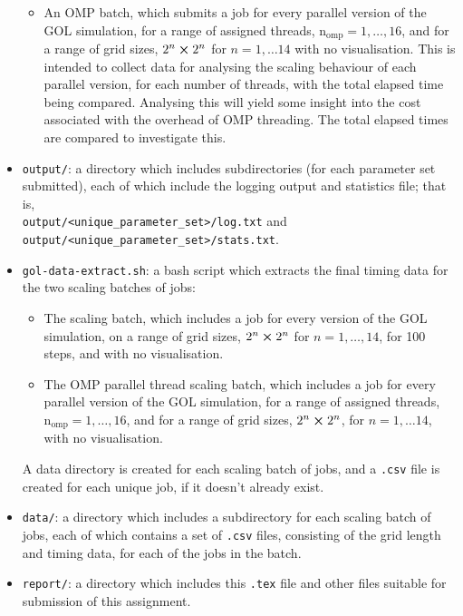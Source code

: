 \documentclass[]{article}
\begin{document}
\begin{itemize}
\begin{itemize}
  \item An OMP batch, which submits a job for every parallel version of the GOL
    simulation, for a range of assigned threads,
    $\mathrm{n_{omp}} = 1, \dotsc, 16$, and for a range of grid sizes,
    $2^{n} \cross 2^{n}$ for $n = 1, \dotsc 14$ with no visualisation.
    This is intended to collect data for analysing the scaling behaviour of each
    parallel version, for each number of threads, with the total elapsed time
    being compared.
    Analysing this will yield some insight into the cost associated with the
    overhead of OMP threading.
    The total elapsed times are compared to investigate this.

  \end{itemize}

\item \lstinline[style=ff]{output/}: a directory which includes subdirectories
  (for each parameter set submitted), each of which include the logging output
  and statistics file; that is, \\
  \lstinline[style=ff]{output/<unique_parameter_set>/log.txt} and \\
  \lstinline[style=ff]{output/<unique_parameter_set>/stats.txt}.

\item \lstinline[style=ff]{gol-data-extract.sh}: a bash script which extracts
  the final timing data for the two scaling batches of jobs:
  \begin{itemize}
  \item The scaling batch, which includes a job for every version of the GOL
    simulation, on a range of grid sizes, $2^{n} \cross 2^{n}$ for
    $n = 1, \dotsc, 14$, for 100 steps, and with no visualisation.

  \item The OMP parallel thread scaling batch, which includes a job for every
    parallel version of the GOL simulation, for a range of assigned threads,
    $\mathrm{n_{omp}} = 1, \dotsc, 16$, and for a range of grid sizes,
    $2^{n} \cross 2^{n}$, for $n = 1, \dotsc 14$, with no visualisation.
  \end{itemize}
  A data directory is created for each scaling batch of jobs, and a
  \lstinline[style=ff]{.csv} file is created for each unique job, if it doesn't
  already exist.

\item \lstinline[style=ff]{data/}: a directory which includes a subdirectory for
  each scaling batch of jobs, each of which contains a set of
  \lstinline[style=ff]{.csv} files, consisting of the grid length and timing
  data, for each of the jobs in the batch.

\item \lstinline[style=ff]{report/}: a directory which includes this
  \lstinline[style=ff]{.tex} file and other files suitable for submission of
  this assignment.
\end{itemize}
\end{document}
